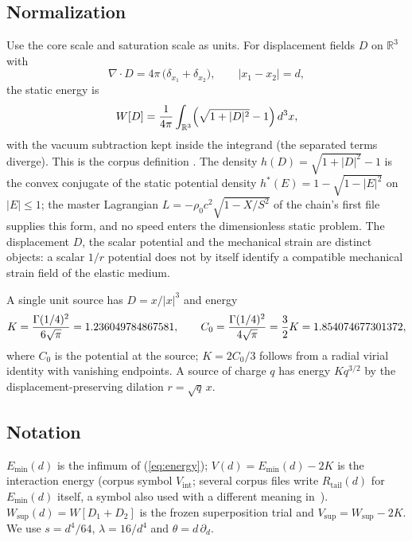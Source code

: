 \documentclass[aps,prd,onecolumn,amsmath,amssymb,longbibliography,floatfix,nofootinbib]{revtex4-2}
\newcommand{\Wsup}{W_{\mathrm{sup}}}
\newcommand{\Emin}{E_{\min}}
\newcommand{\Vsup}{V_{\mathrm{sup}}}
\begin{document}
\subsection{Normalization}
Use the core scale and saturation scale as units. For displacement fields $D$ on $\mathbb{R}^3$ with
\begin{equation}
\nabla\cdot D = 4\pi\,\bigl(\delta_{x_1}+\delta_{x_2}\bigr),\qquad |x_1-x_2|=d,
\end{equation}
the static energy is
\begin{equation}
W[D]=\frac{1}{4\pi}\int_{\mathbb{R}^3}\Bigl(\sqrt{1+|D|^2}-1\Bigr)\,d^3x ,
\label{eq:energy}
\end{equation}
with the vacuum subtraction kept inside the integrand (the separated terms diverge). This is the corpus definition . The density $h(D)=\sqrt{1+|D|^2}-1$ is the convex conjugate of the static potential density $h^*(E)=1-\sqrt{1-|E|^2}$ on $|E|\le 1$; the master Lagrangian $L=-\rho_0c^2\sqrt{1-X/S^2}$ of the chain's first file supplies this form, and no speed enters the dimensionless static problem. The displacement $D$, the scalar potential and the mechanical strain are distinct objects: a scalar $1/r$ potential does not by itself identify a compatible mechanical strain field of the elastic medium.

A single unit source has $D=x/|x|^3$ and energy
\begin{equation}
K=\frac{\Gamma(1/4)^2}{6\sqrt{\pi}}=1.236049784867581 ,\qquad
C_0=\frac{\Gamma(1/4)^2}{4\sqrt{\pi}}=\frac{3}{2}K=1.854074677301372 ,
\end{equation}
where $C_0$ is the potential at the source; $K=2C_0/3$ follows from a radial virial identity with vanishing endpoints. A source of charge $q$ has energy $Kq^{3/2}$ by the displacement-preserving dilation $r=\sqrt{q}\,x$.

\subsection{Notation}
$\Emin(d)$ is the infimum of (\ref{eq:energy}); $V(d)=\Emin(d)-2K$ is the interaction energy (corpus symbol $V_{\mathrm{int}}$; several corpus files write $R_{\mathrm{tail}}(d)$ for $\Emin(d)$ itself, a symbol also used with a different meaning in~\cite{AcorrPaper}). $\Wsup(d)=W[D_1+D_2]$ is the frozen superposition trial and $\Vsup=\Wsup-2K$. We use $s=d^4/64$, $\lambda=16/d^4$ and $\theta=d\,\partial_d$.
\end{document}
